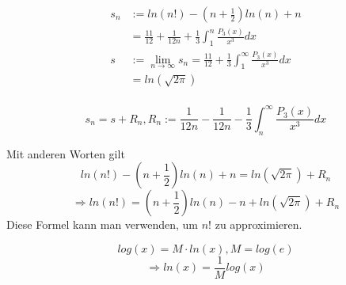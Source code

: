 \documentclass[12pt]{article}
\begin{document}
\begin{align*}
s_n &:= ln(n!) - \left(n + \frac{1}{2}\right)ln(n) + n \\
&= \frac{11}{12} + \frac{1}{12n} + \frac{1}{3} \int_1^n \frac{P_3(x)}{x^3} dx \\
s &:= \lim_{n\to\infty} s_n = \frac{11}{12} + \frac{1}{3} \int_1^{\infty} \frac{P_3(x)}{x^3} dx \\
&= ln(\sqrt{2\pi}) \\
\end{align*}

\[s_n = s + R_n, R_n := \frac{1}{12n} - \frac{1}{12n} - \frac{1}{3}\int_n^{\infty}\frac{P_3(x)}{x^3} dx\]

Mit anderen Worten gilt
\[ln(n!) - \left(n + \frac{1}{2}\right) ln(n) + n = ln(\sqrt{2\pi}) + R_n\]
\[\Longrightarrow ln(n!) = \left(n + \frac{1}{2}\right)ln(n) - n + ln(\sqrt{2\pi}) + R_n\]
Diese Formel kann man verwenden, um \(n!\) zu approximieren.

\[log(x) = M\cdot ln(x), M=log(e)\]
\[\Longrightarrow ln(x) = \frac{1}{M}log(x)\]
\end{document}
